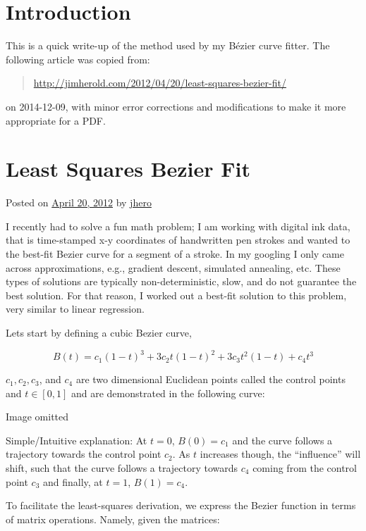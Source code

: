 \documentclass{article}
\begin{document}
\section{Introduction}

This is a quick write-up of the method used by my B\'ezier curve fitter.  The following article was copied from:
\begin{quote}
  \url{http://jimherold.com/2012/04/20/least-squares-bezier-fit/}
\end{quote}
on 2014-12-09, with minor error corrections and modifications to make it more appropriate for a PDF.

\section{Least Squares Bezier Fit}

Posted on \href{http://jimherold.com/2012/04/20/least-squares-bezier-fit/}{April 20, 2012} by \href{jimherold.com/author/jhero}{jhero}

I recently had to solve a fun math problem; I am working with digital ink data, that is time-stamped x-y coordinates of handwritten pen strokes and wanted to the best-fit Bezier curve for a segment of a stroke. In my googling I only came across approximations, e.g., gradient descent, simulated annealing, etc. These types of solutions are typically non-deterministic, slow, and do not guarantee the best solution. For that reason, I worked out a best-fit solution to this problem, very similar to linear regression.

Lets start by defining a cubic Bezier curve,

\[B(t)=c_1(1-t)^3+3c_2t(1-t)^2+3c_3t^2(1-t)+c_4t^3\]

$c_1, c_2, c_3$, and $c_4$ are two dimensional Euclidean points called the control points and $t\in[0,1]$ and are demonstrated in the following curve:

\begin{center}
  \large
  Image omitted
\end{center}

Simple/Intuitive explanation: At $t=0$, $B(0)=c_1$ and the curve follows a trajectory towards the control point $c_2$. As $t$ increases though, the ``influence'' will shift, such that the curve follows a trajectory towards $c_4$ coming from the control point $c_3$ and finally, at $t=1$, $B(1)=c_4$.

To facilitate the least-squares derivation, we express the Bezier function in terms of matrix operations. Namely, given the matrices:
\end{document}
